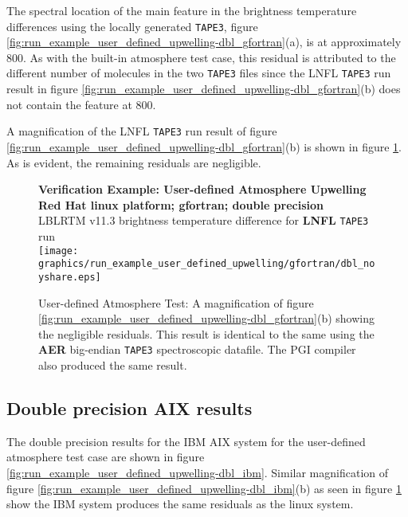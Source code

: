 The spectral location of the main feature in the brightness temperature differences using the locally generated \texttt{TAPE3}, figure \ref{fig:run_example_user_defined_upwelling-dbl_gfortran}(a), is at approximately 800\invcm{}. As with the built-in atmosphere test case, this residual is attributed to the different number of molecules in the two \texttt{TAPE3} files since the LNFL \texttt{TAPE3} run result in figure \ref{fig:run_example_user_defined_upwelling-dbl_gfortran}(b) does not contain the feature at 800\invcm.

A magnification of the LNFL \texttt{TAPE3} run result of figure \ref{fig:run_example_user_defined_upwelling-dbl_gfortran}(b) is shown in figure \ref{fig:run_example_user_defined_upwelling-dbl_gfortran_noyshare}. As is evident, the remaining residuals are negligible.

\begin{figure}[htp]
  \centering
  \qquad\sffamily\textbf{Verification Example: User-defined Atmosphere Upwelling}\\
  \qquad\sffamily\textbf{Red Hat linux platform; gfortran; double precision}\\
  \qquad\textsf{LBLRTM v11.3 brightness temperature difference for \textbf{LNFL} \texttt{TAPE3} run}\\
  \texttt{[image: graphics/run\_example\_user\_defined\_upwelling/gfortran/dbl\_noyshare.eps]}
  \caption{User-defined Atmosphere Test: A magnification of figure \ref{fig:run_example_user_defined_upwelling-dbl_gfortran}(b) showing the negligible residuals. This result is identical to the same using the \textbf{AER} big-endian \texttt{TAPE3} spectroscopic datafile. The PGI compiler also produced the same result.}
  \label{fig:run_example_user_defined_upwelling-dbl_gfortran_noyshare}
\end{figure}


\subsection{Double precision AIX results}

The double precision results for the IBM AIX system for the user-defined atmosphere test case are shown in figure \ref{fig:run_example_user_defined_upwelling-dbl_ibm}. Similar magnification of figure \ref{fig:run_example_user_defined_upwelling-dbl_ibm}(b) as seen in figure \ref{fig:run_example_user_defined_upwelling-dbl_gfortran_noyshare} show the IBM system produces the same residuals as the linux system.

